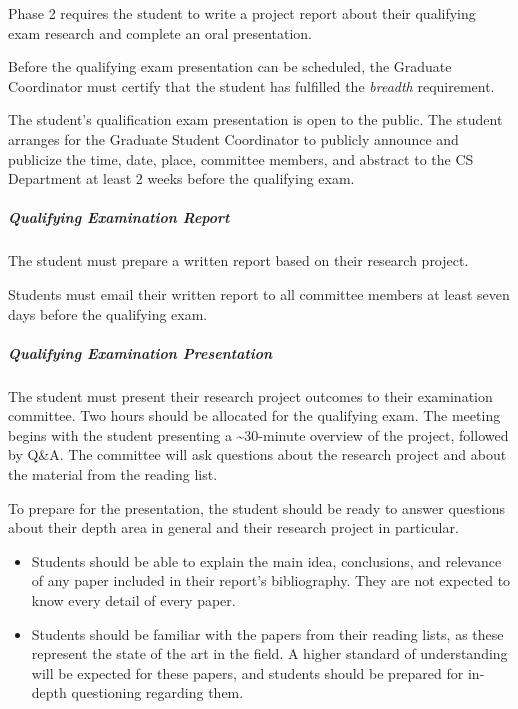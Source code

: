 Phase 2 requires the student to write a project report about their qualifying
exam research and complete an oral presentation.

Before the qualifying exam presentation can be scheduled, the Graduate
Coordinator must certify that the student has fulfilled the \emph
{breadth} requirement.

The student's qualification exam presentation is open to the public. The student
arranges for the Graduate Student Coordinator to publicly announce and
publicize the time, date, place, committee members, and abstract to the CS
Department at least 2 weeks before the qualifying exam.

\hypertarget{qualifying-examination-depth-report}{
\subparagraph{Qualifying Examination Report}
\label{qualifying-examination-depth-report}
}

The student must prepare a written report based on their research project.

Students must email their written report to all committee members at least seven
days before the qualifying exam.

\hypertarget{qualifying-examination}{
\subparagraph{Qualifying Examination Presentation}
\label{qualifying-examination-depth-defense-presentation}
}

The student must present their research project outcomes to their examination
committee. Two hours should be allocated for the qualifying exam. The meeting
begins with the student presenting a \textasciitilde30-minute overview of the
project, followed by Q\&A. The committee will ask questions about the research
project and about the material from the reading list.

To prepare for the presentation, the student should be ready to answer
questions about their depth area in general and their research project
in particular.


\begin{itemize}[nosep]
    \item Students should be able to explain the main idea, conclusions, and
     relevance of any paper included in their report's bibliography. They are
     not expected to know every detail of every paper.

    \item Students should be familiar with the papers from their reading lists,
     as these represent the state of the art in the field. A higher standard of
     understanding will be expected for these papers, and students should be
     prepared for in-depth questioning regarding them.
\end{itemize}


